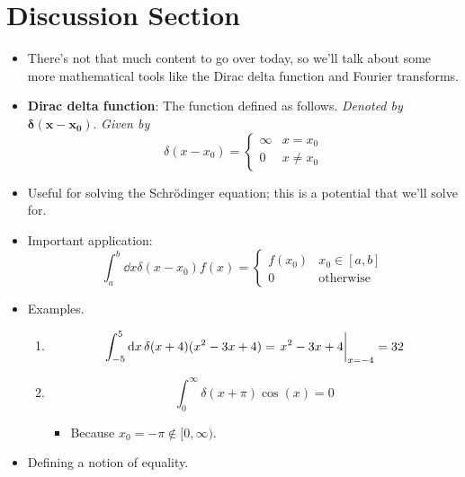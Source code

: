 \documentclass[../notes.tex]{subfiles}
\begin{document}
\section{Discussion Section}
\begin{itemize}
    \item There's not that much content to go over today, so we'll talk about some more mathematical tools like the Dirac delta function and Fourier transforms.
    \item \textbf{Dirac delta function}: The function defined as follows. \emph{Denoted by} $\bm{\delta(x-x_0)}$. \emph{Given by}
    \begin{equation*}
        \delta(x-x_0) =
        \begin{cases}
            \infty & x=x_0\\
            0 & x\neq x_0
        \end{cases}
    \end{equation*}
    \item Useful for solving the Schr\"{o}dinger equation; this is a potential that we'll solve for.
    \item Important application:
    \begin{equation*}
        \int_a^b\dd{x}\delta(x-x_0)f(x) =
        \begin{cases}
            f(x_0) & x_0\in[a,b]\\
            0 & \text{otherwise}
        \end{cases}
    \end{equation*}
    \item Examples.
    \begin{enumerate}
        \item 
        \begin{equation*}
            \int_{-5}^5\dd{x}\delta(x+4)(x^2-3x+4) = \eval{x^2-3x+4}_{x=-4}
            = 32
        \end{equation*}
        \item 
        \begin{equation*}
            \int_0^\infty\delta(x+\pi)\cos(x) = 0
        \end{equation*}
        \begin{itemize}
            \item Because $x_0=-\pi\notin[0,\infty)$.
        \end{itemize}
    \end{enumerate}
    \item Defining a notion of equality.
    \begin{itemize}

\end{itemize}
\end{itemize}
\end{document}
